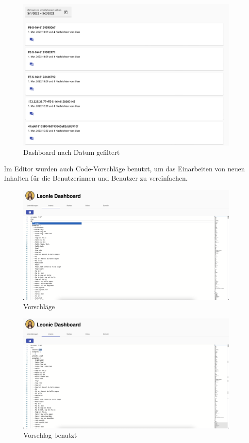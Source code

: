 \begin{figure}[hbt!]
    \centering
    \includegraphics[scale=0.2]{pics/dashboardDate}
    \caption{Dashboard nach Datum gefiltert}
    \label{fig:impl:dashboardDate}
\end{figure}

Im Editor wurden auch Code-Vorschläge benutzt, um das Einarbeiten von neuen Inhalten für die Benutzerinnen und Benutzer zu vereinfachen.

\begin{figure}[hbt!]
    \centering
    \includegraphics[scale=0.2]{pics/dashboardCodeSuggestion}
    \caption{Vorschläge}
    \label{fig:impl:dashboardCodeSuggestion}
\end{figure}
\begin{figure}[hbt!]
    \centering
    \includegraphics[scale=0.2]{pics/dashboardSuggestionMade}
    \caption{Vorschlag benutzt}
    \label{fig:impl:dashboardCodeSuggestionMade}
\end{figure}

